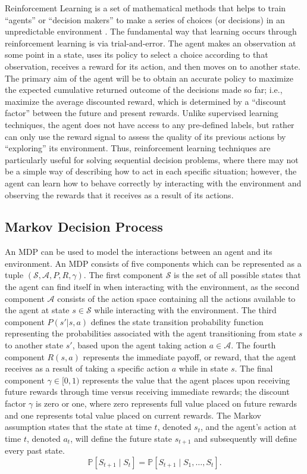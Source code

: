 Reinforcement Learning is a set of mathematical methods that helps to train ``agents'' or ``decision makers'' to make a series of choices (or decisions) in an unpredictable environment \citep{sutton2018reinforcement}. The fundamental way that learning occurs through reinforcement learning is via trial-and-error. The agent makes an observation at some point in a state, uses its policy to select a choice according to that observation, receives a reward for its action, and then moves on to another state. The primary aim of the agent will be to obtain an accurate policy to maximize the expected cumulative returned outcome of the decisions made so far; i.e., maximize the average discounted reward, which is determined by a ``discount factor'' between the future and present rewards. Unlike supervised learning techniques, the agent does not have access to any pre-defined labels, but rather can only use the reward signal to assess the quality of its previous actions by ``exploring'' its environment. Thus, reinforcement learning techniques are particularly useful for solving sequential decision problems, where there may not be a simple way of describing how to act in each specific situation; however, the agent can learn how to behave correctly by interacting with the environment and observing the rewards that it receives as a result of its actions.

\subsection{Markov Decision Process}

An MDP can be used to model the interactions between an agent and its environment. An MDP consists of five components which can be represented as a tuple $(\mathcal{S}, \mathcal{A}, P, R, \gamma)$. The first component $\mathcal{S}$ is the set of all possible states that the agent can find itself in when interacting with the environment, as the second component $\mathcal{A}$ consists of the action space containing all the actions available to the agent at state $s \in \mathcal{S}$ while interacting with the environment. The third component $P(s' | s, a)$ defines the state transition probability function representing the probabilities associated with the agent transitioning from state $s$ to another state $s'$, based upon the agent taking action $a \in \mathcal{A}$. The fourth component $R(s, a)$ represents the immediate payoff, or reward, that the agent receives as a result of taking a specific action $a$ while in state $s$. The final component $\gamma \in [0, 1)$ represents the value that the agent places upon receiving future rewards through time versus receiving immediate rewards; the discount factor $\gamma$ is zero or one, where zero represents full value placed on future rewards and one represents total value placed on current rewards. The Markov assumption states that the state at time $t$, denoted $s_t$, and the agent's action at time $t$, denoted $a_t$, will define the future state $s_{t+1}$ and subsequently will define every past state.
\begin{equation}
    \mathbb{P}[S_{t+1} \mid S_t] = \mathbb{P}[S_{t+1} \mid S_1, \ldots, S_t].
    \label{eq:markov}
\end{equation}

